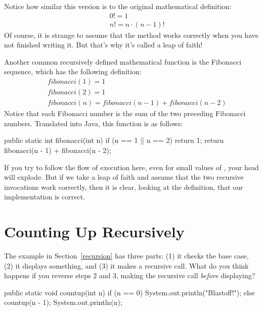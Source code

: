 Notice how similar this version is to the original mathematical definition:
%
\begin{eqnarray*}
&&  0! = 1 \\
&&  n! = n \cdot(n-1)!
\end{eqnarray*}
%
Of course, it is strange to assume that the method works correctly when you have not finished writing it.
But that's why it's called a leap of faith!


\label{fibonacci}


Another common recursively defined mathematical function is the Fibonacci sequence, which has the following definition:
%
\begin{eqnarray*}
&& fibonacci(1) = 1 \\
&& fibonacci(2) = 1 \\
&& fibonacci(n) = fibonacci(n-1) + fibonacci(n-2)
\end{eqnarray*}
%
Notice that each Fibonacci number is the sum of the two preceding Fibonacci numbers.
Translated into Java, this function is as follows:

\begin{code}
public static int fibonacci(int n) {
    if (n == 1 || n == 2) {
        return 1;
    }
    return fibonacci(n - 1) + fibonacci(n - 2);
}
\end{code}

If you try to follow the flow of execution here, even for small values of , your head will explode.
But if we take a leap of faith and assume that the two recursive invocations work correctly, then it is clear, looking at the definition, that our implementation is correct.


\section{Counting Up Recursively}
\label{countup}

The  example in Section~\ref{recursion} has three parts: (1) it checks the base case, (2) it displays something, and (3) it makes a recursive call.
What do you think happens if you reverse steps 2 and 3, making the recursive call {\em before} displaying?

\begin{code}
public static void countup(int n) {
    if (n == 0) {
        System.out.println("Blastoff!");
    } else {
        countup(n - 1);
        System.out.println(n);
    }
}
\end{code}

